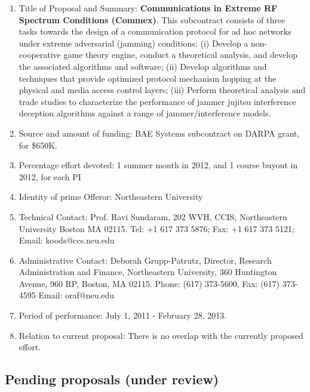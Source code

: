 \begin{enumerate}
\item Title of Proposal and Summary: {\bf Communications in Extreme RF
  Spectrum Conditions (Commex)}.  This subcontract consists of three
  tasks towards the design of a communication protocol for ad hoc
  networks under extreme adversarial (jamming) conditions: (i) Develop
  a non-cooperative game theory engine, conduct a theoretical
  analysis, and develop the associated algorithms and software; (ii)
  Develop algorithms and techniques that provide optimized protocol
  mechanism hopping at the physical and media access control layers;
  (iii) Perform theoretical analysis and trade studies to characterize
  the performance of jammer jujitsu interference deception algorithms
  against a range of jammer/interference models.  
\item Source and amount of funding: BAE Systems subcontract on DARPA
  grant, for \$650K.
\item Percentage effort devoted: 1 summer month in 2012, and 1 course buyout in 2012, for each PI
\item Identity of prime Offeror: Northeastern University
\item Technical Contact: Prof. Ravi Sundaram,  202 WVH, CCIS, Northeastern University
Boston MA 02115.  Tel: +1 617 373 5876;  Fax: +1 617 373 5121;  Email: koods@ccs.neu.edu 
\item Administrative Contact: Deborah Grupp-Patrutz, Director,
  Research Administration and Finance, Northeastern University, 360
  Huntington Avenue, 960 RP, Boston, MA 02115. Phone: (617) 373-5600,
  Fax: (617) 373-4595 Email: oraf@neu.edu
\item  Period of performance: July 1, 2011 - February 28, 2013.
\item Relation to current proposal: There is no overlap with the currently proposed effort.
\end{enumerate}

\subsection{Pending proposals (under review)}

